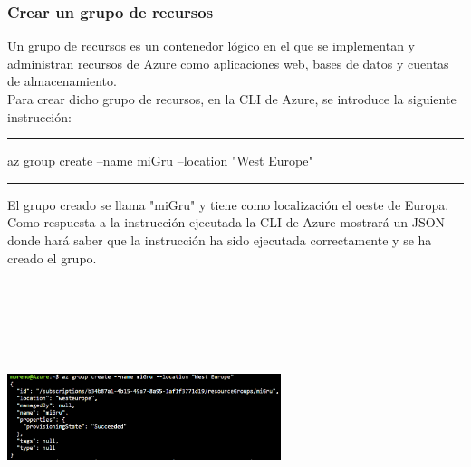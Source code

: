 \documentclass[english,runningheads,a4paper]{llncs}[2018/03/10]
\newenvironment{nscenter}
 {\parskip=0pt\par\nopagebreak\centering}
 {\par\noindent\ignorespacesafterend}
\begin{document}
\subsubsection*{Crear un grupo de recursos}
Un grupo de recursos es un contenedor lógico en el que se implementan y 
administran recursos de Azure como aplicaciones web, bases de datos y cuentas de
almacenamiento. \\
Para crear dicho grupo de recursos, en la CLI de Azure, se introduce la 
siguiente instrucción: \\
\begin{nscenter}
\noindent\rule{10cm}{0.4pt}

az group create --name miGru --location "West Europe"

\noindent\rule{10cm}{0.4pt}
\end{nscenter}
\newline
El grupo creado se llama "miGru" y tiene como localización el oeste de Europa.\\
Como respuesta a la instrucción ejecutada la CLI de Azure mostrará un JSON donde
hará saber que la instrucción ha sido ejecutada correctamente y se ha creado el 
grupo.
\newline
\begin{nscenter}
\includegraphics[width=8cm,height=8cm,keepaspectratio]{./Contenedores/Azure/2.png}
\end{nscenter}
\end{document}
